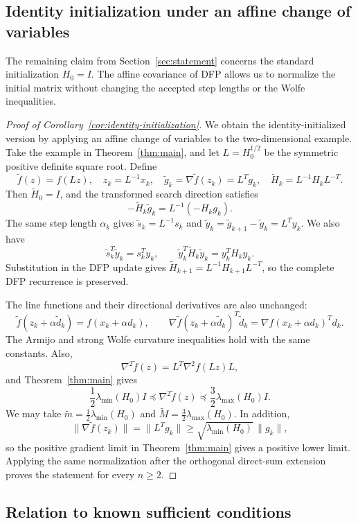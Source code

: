\documentclass[11pt]{article}
\begin{document}
\subsection{Identity initialization under an affine change of variables}

The remaining claim from Section~\ref{sec:statement} concerns the standard
initialization $H_0=I$.  The affine covariance of DFP allows us to normalize
the initial matrix without changing the accepted step lengths or the Wolfe
inequalities.

\begin{proof}[Proof of Corollary~\ref{cor:identity-initialization}]
We obtain the identity-initialized version by applying an affine change of
variables to the two-dimensional example.  Take the example in
Theorem~\ref{thm:main}, and let
$L=H_0^{1/2}$ be the symmetric positive definite square root.  Define
\[
\widetilde f(z)=f(Lz),\quad z_k=L^{-1}x_k,\quad
\widetilde g_k=\nabla\widetilde f(z_k)=L^Tg_k,\quad
\widetilde H_k=L^{-1}H_kL^{-T}.
\]
Then $\widetilde H_0=I$, and the transformed search direction satisfies
\[
-\widetilde H_k\widetilde g_k
=L^{-1}(-H_kg_k).
\]
The same step length $\alpha_k$ gives
$\widetilde s_k=L^{-1}s_k$ and
$\widetilde y_k=\widetilde g_{k+1}-\widetilde g_k=L^Ty_k$.  We also have
\[
\widetilde s_k^T\widetilde y_k=s_k^Ty_k,
\qquad
\widetilde y_k^T\widetilde H_k\widetilde y_k=y_k^TH_ky_k.
\]
Substitution in the DFP update gives
$\widetilde H_{k+1}=L^{-1}H_{k+1}L^{-T}$, so the complete DFP recurrence is
preserved.

The line functions and their directional derivatives are also unchanged:
\[
\widetilde f(z_k+\alpha\widetilde d_k)
=f(x_k+\alpha d_k),\qquad
\nabla\widetilde f(z_k+\alpha\widetilde d_k)^T\widetilde d_k
=\nabla f(x_k+\alpha d_k)^Td_k.
\]
The Armijo and strong Wolfe curvature inequalities hold with the same
constants.  Also,
\[
\nabla^2\widetilde f(z)=L^T\nabla^2f(Lz)L,
\]
and Theorem~\ref{thm:main} gives
\[
\frac12\lambda_{\min}(H_0)I
\preceq\nabla^2\widetilde f(z)
\preceq\frac32\lambda_{\max}(H_0)I.
\]
We may take
$\widetilde m=\frac12\lambda_{\min}(H_0)$ and
$\widetilde M=\frac32\lambda_{\max}(H_0)$.  In addition,
\[
\|\nabla\widetilde f(z_k)\|=\|L^Tg_k\|
\ge \sqrt{\lambda_{\min}(H_0)}\,\|g_k\|,
\]
so the positive gradient limit in Theorem~\ref{thm:main} gives a positive
lower limit.  Applying the same normalization after the orthogonal
direct-sum extension proves the statement for every $n\ge2$.
\end{proof}

\subsection{Relation to known sufficient conditions}
\label{sec:known-results}
\end{document}
